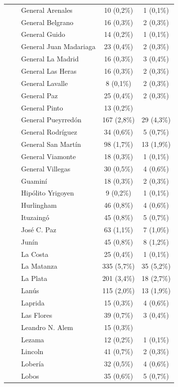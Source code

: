 \documentclass[
  spanish,
  a4paper,
]{scrreprt}
\begin{document}
\begin{table}
{\begin{tabular*}{\linewidth}{@{\extracolsep{\fill}}lcc}
    General Arenales & 10 (0,2\%) & 1 (0,1\%) \\ 
    General Belgrano & 16 (0,3\%) & 2 (0,3\%) \\ 
    General Guido & 14 (0,2\%) & 1 (0,1\%) \\ 
    General Juan Madariaga & 23 (0,4\%) & 2 (0,3\%) \\ 
    General La Madrid & 16 (0,3\%) & 3 (0,4\%) \\ 
    General Las Heras & 16 (0,3\%) & 2 (0,3\%) \\ 
    General Lavalle & 8 (0,1\%) & 2 (0,3\%) \\ 
    General Paz & 25 (0,4\%) & 2 (0,3\%) \\ 
    General Pinto & 13 (0,2\%) &  \\ 
    General Pueyrredón & 167 (2,8\%) & 29 (4,3\%) \\ 
    General Rodríguez & 34 (0,6\%) & 5 (0,7\%) \\ 
    General San Martín & 98 (1,7\%) & 13 (1,9\%) \\ 
    General Viamonte & 18 (0,3\%) & 1 (0,1\%) \\ 
    General Villegas & 30 (0,5\%) & 4 (0,6\%) \\ 
    Guaminí & 18 (0,3\%) & 2 (0,3\%) \\ 
    Hipólito Yrigoyen & 9 (0,2\%) & 1 (0,1\%) \\ 
    Hurlingham & 46 (0,8\%) & 4 (0,6\%) \\ 
    Ituzaingó & 45 (0,8\%) & 5 (0,7\%) \\ 
    José C. Paz & 63 (1,1\%) & 7 (1,0\%) \\ 
    Junín & 45 (0,8\%) & 8 (1,2\%) \\ 
    La Costa & 25 (0,4\%) & 1 (0,1\%) \\ 
    La Matanza & 335 (5,7\%) & 35 (5,2\%) \\ 
    La Plata & 201 (3,4\%) & 18 (2,7\%) \\ 
    Lanús & 115 (2,0\%) & 13 (1,9\%) \\ 
    Laprida & 15 (0,3\%) & 4 (0,6\%) \\ 
    Las Flores & 39 (0,7\%) & 3 (0,4\%) \\ 
    Leandro N. Alem & 15 (0,3\%) &  \\ 
    Lezama & 12 (0,2\%) & 1 (0,1\%) \\ 
    Lincoln & 41 (0,7\%) & 2 (0,3\%) \\ 
    Lobería & 32 (0,5\%) & 4 (0,6\%) \\ 
    Lobos & 35 (0,6\%) & 5 (0,7\%) \\ 

\end{tabular*}}
\end{table}
\end{document}
